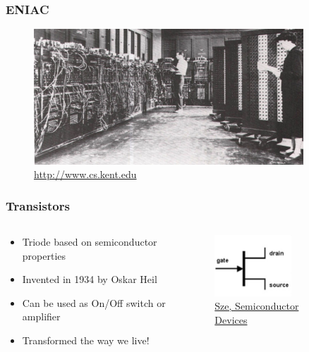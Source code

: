 \documentclass{beamer}
\begin{document}
\begin{frame}\frametitle{ENIAC}
\begin{figure}[H]
\centering
\includegraphics[width=0.9\textwidth]{eniac}%
\caption{\url{http://www.cs.kent.edu}}%
\end{figure}
\end{frame}


\begin{frame}\frametitle{Transistors} 
\begin{columns}
\begin{column}{6cm}
\begin{itemize}
\item Triode based on semiconductor properties
\pause
\item Invented in 1934 by Oskar Heil
\pause
\item Can be used as On/Off switch or amplifier
\pause
\item Transformed the way we live!
\end{itemize}
\end{column}
\begin{column}{6cm}
\begin{figure}[H]
\centering
\includegraphics[width=0.65\textwidth]{transistor}%
\caption{\url{Sze, Semiconductor Devices}}%
\end{figure}
\end{column}
\end{columns}
\end{frame}
\end{document}

